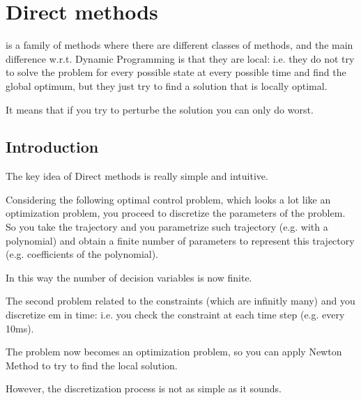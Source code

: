 \section{Direct methods}

 is a family of methods where there are different classes of methods, and the main difference w.r.t. Dynamic Programming is that they are local: i.e. they do not try to solve the problem for every possible state at every possible time and find the global optimum, but they just try to find a solution that is locally optimal.

It means that if you try to perturbe the solution you can only do worst.

\subsection{Introduction}

The key idea of Direct methods is really simple and intuitive.

Considering the following optimal control problem, which looks a lot like an optimization problem, you proceed to discretize the parameters of the problem. So you take the trajectory  and you parametrize such trajectory (e.g. with a polynomial) and obtain a finite number of parameters to represent this trajectory (e.g. coefficients of the polynomial).

In this way the number of decision variables is now finite.

The second problem related to the constraints (which are infinitly many) and you discretize em in time: i.e. you check the constraint at each time step (e.g. every 10ms).

The problem now becomes an optimization problem, so you can apply Newton Method to try to find the local solution.
 
However, the discretization process is not as simple as it sounds.

